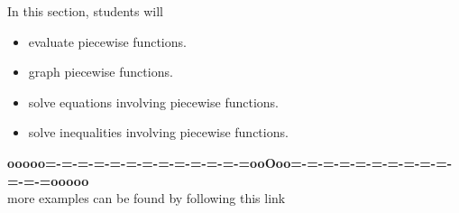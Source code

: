 \documentclass{ximera}
\begin{document}
\begin{sectionOutcomes}
In this section, students will 

\begin{itemize}
\item evaluate piecewise functions.
\item graph piecewise functions.
\item solve equations involving piecewise functions.
\item solve inequalities involving piecewise functions.
\end{itemize}
\end{sectionOutcomes}


















\begin{center}
\textbf{\textcolor{green!50!black}{ooooo=-=-=-=-=-=-=-=-=-=-=-=-=ooOoo=-=-=-=-=-=-=-=-=-=-=-=-=ooooo}} \\

more examples can be found by following this link\\ 

\end{center}
\end{document}
